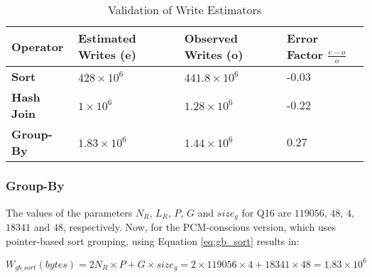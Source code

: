 \begin{table}[t]                                                                                       
\centering                                                                                              
\caption{Validation of Write Estimators}
  \label{tab:estimator_validation}                                                                                
  \begin{small}                                                                                           
  \begin{tabular}{p{3cm}p{3cm}p{3cm}p{2.5cm}}
  \toprule                                                                                                
  
  \textbf{Operator} & \textbf{Estimated Writes} (e) & \textbf{Observed Writes} (o) & \textbf{Error Factor} $\frac{e-o}{o}$\\
  \midrule                                                                                                
  
    \textbf{Sort} &  $428 \times 10^6$ & $441.8 \times 10^6$ & -0.03\\ 
  \textbf{Hash Join} &  $1 \times 10^6$ & $1.28 \times 10^6$ & -0.22\\ 
  \textbf{Group-By} &  $1.83 \times 10^6$ &$1.44 \times 10^6$ & 0.27\\ 
  
  \bottomrule                                                                                             
  \end{tabular}                                                                                           
  \end{small}                                                                                             
  \end{table} 
  
\subsubsection{Group-By}
The values of the parameters $N_R$, $L_R$, $P$, $G$ and $size_g$ for Q16
are $119056$, $48$, $4$, $18341$ and $48$, respectively.  
Now, for the PCM-conscious version, which uses pointer-based sort grouping,
using Equation \ref{eq:gb_sort} results in:

\begin{small}
$$W_{gb\_sort}(bytes) = 2N_R \times P + G \times size_g = 2 \times 119056\times 4 + 18341 \times 48
= 1.83 \times 10^6$$
\end{small}

